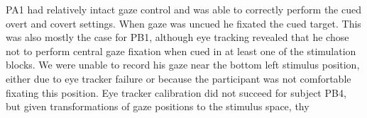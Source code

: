 
PA1 had relatively intact gaze control and was able to correctly perform the
cued overt and covert settings.
When gaze was uncued he fixated the cued target.
This was also mostly the case for PB1, although eye tracking revealed that he
chose not to perform central gaze fixation when cued in at least one of the
stimulation blocks. We were unable to record his gaze near the bottom left
stimulus position, either due to eye tracker failure or because the participant
was not comfortable fixating this position.
Eye tracker calibration did not succeed for subject PB4, but given
transformations of gaze positions to the stimulus space, thy

